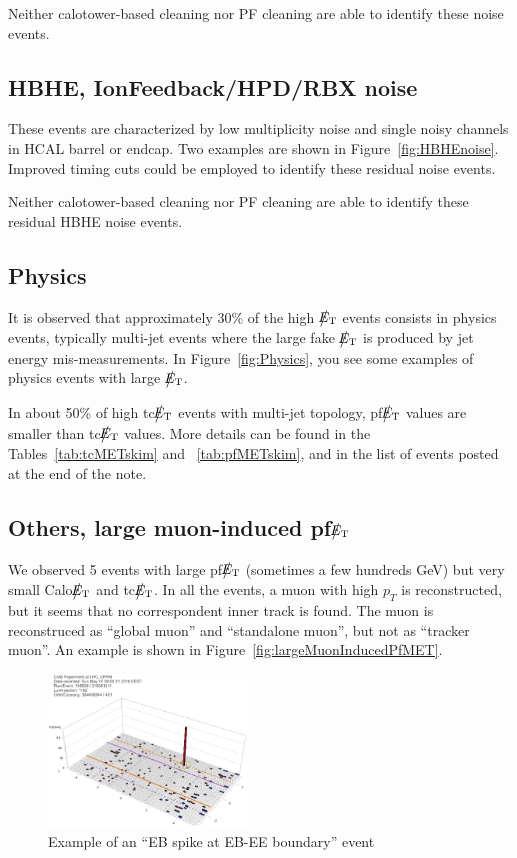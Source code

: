 Neither calotower-based cleaning nor PF cleaning are able to identify these noise events.

\subsection{HBHE, IonFeedback/HPD/RBX noise}
These events are characterized by low multiplicity noise and single noisy channels in HCAL barrel or endcap.
Two examples are shown in Figure~\ref{fig:HBHEnoise}.
Improved timing cuts could be employed to identify these residual noise events.

Neither calotower-based cleaning nor PF cleaning are able to identify these residual HBHE noise events.

\subsection{Physics}
It is observed that approximately 30\% of the high $\big\slash\hspace{-1.6ex}{E_\text{T}}$ events consists in physics events, 
typically multi-jet events where the large fake $\big\slash\hspace{-1.6ex}{E_\text{T}}$ is produced by jet energy mis-measurements.
In Figure~\ref{fig:Physics}, you see some examples of physics events with large $\big\slash\hspace{-1.6ex}{E_\text{T}}$. 

In about 50\% of high tc$\big\slash\hspace{-1.6ex}{E_\text{T}}$ events with multi-jet topology, pf$\big\slash\hspace{-1.6ex}{E_\text{T}}$ values are 
smaller than tc$\big\slash\hspace{-1.6ex}{E_\text{T}}$ values. More details can be found in 
the Tables~\ref{tab:tcMETskim} and ~\ref{tab:pfMETskim}, and in the list of events posted at the end of the note.

\subsection{Others, large muon-induced pf$\big\slash\hspace{-1.6ex}{E_\text{T}}$}
We observed 5 events with large pf$\big\slash\hspace{-1.6ex}{E_\text{T}}$ (sometimes a few hundreds GeV) 
but very small Calo$\big\slash\hspace{-1.6ex}{E_\text{T}}$ and tc$\big\slash\hspace{-1.6ex}{E_\text{T}}$. In all the events, a muon with high $p_{T}$
is reconstructed, but it seems that no correspondent inner track is found.
The muon is reconstruced as ``global muon'' and ``standalone muon'', 
but not as ``tracker muon''. An example is shown in Figure~\ref{fig:largeMuonInducedPfMET}.

%
\begin{figure}[h]
 \centering
   \includegraphics[width=0.47\textwidth]{fig/EBspikeAtBorder.eps} 
\caption{Example of an ``EB spike at EB-EE boundary'' event}
\label{fig:EBspikeAtBorder}
\end{figure}


